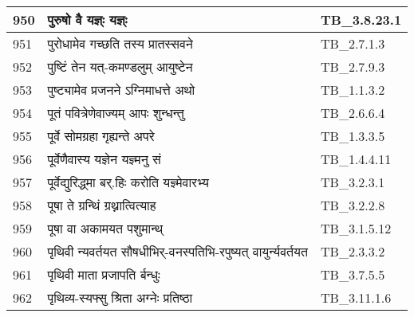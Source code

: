 \documentclass[17pt]{extarticle}
\begin{document}
\begin{longtable}{||p{0.4in}||p{4.9in}||p{0.9in}||}
    950 & पुरुषो वै यज्ञ्ः यज्ञ्ः & TB\_3.8.23.1       \\
    
    \hline
        
    951 & पुरोधामेव गच्छति तस्य प्रातस्सवने & TB\_2.7.1.3       \\
    
    \hline
        
    952 & पुष्टिं तेन यत्{-}कमण्डलुम् आयुष्टेन & TB\_2.7.9.3       \\
    
    \hline
        
    953 & पुष्ट्यामेव प्रजनने ऽग्निमाधत्ते अथो & TB\_1.1.3.2       \\
    
    \hline
        
    954 & पूतं पवित्रेणेवाज्यम् आपः शुन्धन्तु & TB\_2.6.6.4       \\
    
    \hline
        
    955 & पूर्वे सोमग्रहा गृह्यन्ते अपरे & TB\_1.3.3.5       \\
    
    \hline
        
    956 & पूर्वेणैवास्य यज्ञेन यज्ञ्मनु सं & TB\_1.4.4.11       \\
    
    \hline
        
    957 & पूर्वेद्युरिद्ध्मा बर्.हिः करोति यज्ञ्मेवारभ्य & TB\_3.2.3.1       \\
    
    \hline
        
    958 & पूषा ते ग्रन्थिं ग्रथ्नात्वित्याह & TB\_3.2.2.8       \\
    
    \hline
        
    959 & पूषा वा अकामयत पशुमान्थ् & TB\_3.1.5.12       \\
    
    \hline
        
    960 & पृथिवी न्यवर्तयत सौषधीभिर्{-}वनस्पतिभि{-}रपुष्यत् वायुर्न्यवर्तयत & TB\_2.3.3.2       \\
    
    \hline
        
    961 & पृथिवी माता प्रजापति र्बन्धुः & TB\_3.7.5.5       \\
    
    \hline
        
    962 & पृथिव्य{-}स्यफ्सु श्रिता अग्नेः प्रतिष्ठा & TB\_3.11.1.6       \\
    

\end{longtable}
\end{document}
